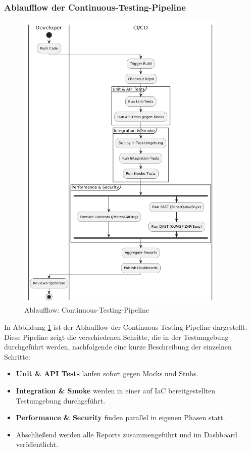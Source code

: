 \subsubsection{Ablaufflow der Continuous-Testing-Pipeline}

\begin{figure}[h!]
\centering
    \includegraphics[width=0.9\textwidth]{fig/ablauf_pipeline.png}
    \caption{Ablaufflow: Continuous-Testing-Pipeline}
    \label{fig:flow}
\end{figure}

In Abbildung \ref{fig:flow} ist der Ablaufflow der Continuous-Testing-Pipeline dargestellt.
Diese Pipeline zeigt die verschiedenen Schritte, die in der Testumgebung durchgeführt werden,
nachfolgende eine kurze Beschreibung der einzelnen Schritte:

\begin{itemize}
    \item \textbf{Unit \& API Tests} laufen sofort gegen Mocks und Stubs.
    \item \textbf{Integration \& Smoke} werden in einer auf IaC bereitgestellten Testumgebung durchgeführt.
    \item \textbf{Performance \& Security} finden parallel in eigenen Phasen statt.
    \item Abschließend werden alle Reports zusammengeführt und im Dashboard veröffentlicht.
\end{itemize}

